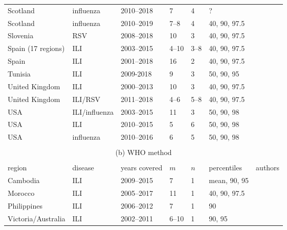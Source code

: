 \documentclass{article}
\begin{document}
\begin{table}[h!]
\begin{tabular}{l l l l l l l}
Scotland & influenza & 2010--2018 & 7 & 4 & ? & \cite{Murray2018}\\
Scotland & influenza & 2010--2019 & 7--8 & 4 & 40, 90, 97.5 & \cite{Dickson2020}\\
Slovenia & RSV & 2008--2018 & 10 & 3 & 40, 90, 97.5 & \cite{Grilc2021}\\
Spain (17 regions) & ILI & 2003--2015 & 4--10 & 3--8 & 40, 90, 97.5 & \cite{Bangert2017}\\
Spain & ILI & 2001--2018 & 16 & 2 & 40, 90, 97.5 & \cite{RedondoBravo2020}\\
Tunisia & ILI & 2009-2018 & 9 & 3 & 50, 90, 95 & \cite{Bouguerra2020}\\
United Kingdom & ILI & 2000--2013 & 10 & 3 & 40, 90, 97.5 & \cite{Green2015}\\
United Kingdom & ILI/RSV & 2011--2018 & 4--6 & 5--8 & 40, 90, 97.5 & \cite{Harcourt2019}\\
USA & ILI/influenza & 2003--2015 & 11 & 3 & 50, 90, 98 & \cite{Biggerstaff2017}\\
USA & ILI & 2010--2015 & 5 & 6 & 50, 90, 98 & \cite{Dahlgren2018}\\
USA & influenza & 2010--2016 & 6 & 5 & 50, 90, 98 & \cite{Dahlgren2019}\\
\bottomrule\\
\multicolumn{7}{c}{(b) WHO method}\\ \\
\toprule
region & disease & years covered & $m$ & $n$ & percentiles & authors\\
\midrule
Cambodia & ILI & 2009--2015 & 7 & 1 & mean, 90, 95 & \cite{Ly2017}\\
Morocco & ILI & 2005--2017 & 11 & 1 & 40, 90, 97.5 & \cite{Rguig2020}\\
Philippines & ILI & 2006--2012 & 7 & 1 & 90 & \cite{Lucero2016}\\
Victoria/Australia & ILI & 2002--2011 & 6--10 & 1 & 90, 95 & \cite{Tay2013}\\
\end{tabular}
\end{table}

\newpage



\end{document}
